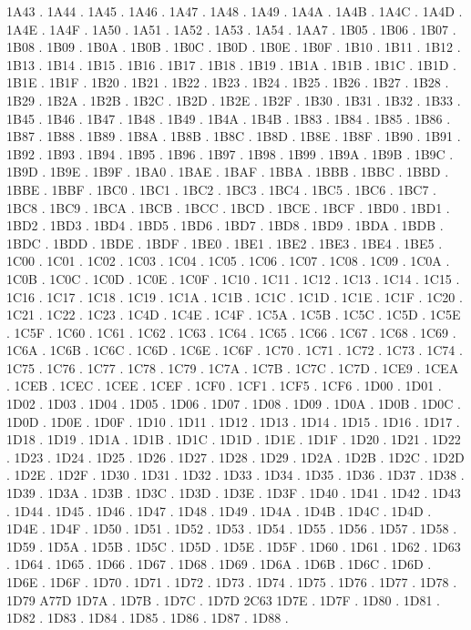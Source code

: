 1A43 .
1A44 .
1A45 .
1A46 .
1A47 .
1A48 .
1A49 .
1A4A .
1A4B .
1A4C .
1A4D .
1A4E .
1A4F .
1A50 .
1A51 .
1A52 .
1A53 .
1A54 .
1AA7 .
1B05 .
1B06 .
1B07 .
1B08 .
1B09 .
1B0A .
1B0B .
1B0C .
1B0D .
1B0E .
1B0F .
1B10 .
1B11 .
1B12 .
1B13 .
1B14 .
1B15 .
1B16 .
1B17 .
1B18 .
1B19 .
1B1A .
1B1B .
1B1C .
1B1D .
1B1E .
1B1F .
1B20 .
1B21 .
1B22 .
1B23 .
1B24 .
1B25 .
1B26 .
1B27 .
1B28 .
1B29 .
1B2A .
1B2B .
1B2C .
1B2D .
1B2E .
1B2F .
1B30 .
1B31 .
1B32 .
1B33 .
1B45 .
1B46 .
1B47 .
1B48 .
1B49 .
1B4A .
1B4B .
1B83 .
1B84 .
1B85 .
1B86 .
1B87 .
1B88 .
1B89 .
1B8A .
1B8B .
1B8C .
1B8D .
1B8E .
1B8F .
1B90 .
1B91 .
1B92 .
1B93 .
1B94 .
1B95 .
1B96 .
1B97 .
1B98 .
1B99 .
1B9A .
1B9B .
1B9C .
1B9D .
1B9E .
1B9F .
1BA0 .
1BAE .
1BAF .
1BBA .
1BBB .
1BBC .
1BBD .
1BBE .
1BBF .
1BC0 .
1BC1 .
1BC2 .
1BC3 .
1BC4 .
1BC5 .
1BC6 .
1BC7 .
1BC8 .
1BC9 .
1BCA .
1BCB .
1BCC .
1BCD .
1BCE .
1BCF .
1BD0 .
1BD1 .
1BD2 .
1BD3 .
1BD4 .
1BD5 .
1BD6 .
1BD7 .
1BD8 .
1BD9 .
1BDA .
1BDB .
1BDC .
1BDD .
1BDE .
1BDF .
1BE0 .
1BE1 .
1BE2 .
1BE3 .
1BE4 .
1BE5 .
1C00 .
1C01 .
1C02 .
1C03 .
1C04 .
1C05 .
1C06 .
1C07 .
1C08 .
1C09 .
1C0A .
1C0B .
1C0C .
1C0D .
1C0E .
1C0F .
1C10 .
1C11 .
1C12 .
1C13 .
1C14 .
1C15 .
1C16 .
1C17 .
1C18 .
1C19 .
1C1A .
1C1B .
1C1C .
1C1D .
1C1E .
1C1F .
1C20 .
1C21 .
1C22 .
1C23 .
1C4D .
1C4E .
1C4F .
1C5A .
1C5B .
1C5C .
1C5D .
1C5E .
1C5F .
1C60 .
1C61 .
1C62 .
1C63 .
1C64 .
1C65 .
1C66 .
1C67 .
1C68 .
1C69 .
1C6A .
1C6B .
1C6C .
1C6D .
1C6E .
1C6F .
1C70 .
1C71 .
1C72 .
1C73 .
1C74 .
1C75 .
1C76 .
1C77 .
1C78 .
1C79 .
1C7A .
1C7B .
1C7C .
1C7D .
1CE9 .
1CEA .
1CEB .
1CEC .
1CEE .
1CEF .
1CF0 .
1CF1 .
1CF5 .
1CF6 .
1D00 .
1D01 .
1D02 .
1D03 .
1D04 .
1D05 .
1D06 .
1D07 .
1D08 .
1D09 .
1D0A .
1D0B .
1D0C .
1D0D .
1D0E .
1D0F .
1D10 .
1D11 .
1D12 .
1D13 .
1D14 .
1D15 .
1D16 .
1D17 .
1D18 .
1D19 .
1D1A .
1D1B .
1D1C .
1D1D .
1D1E .
1D1F .
1D20 .
1D21 .
1D22 .
1D23 .
1D24 .
1D25 .
1D26 .
1D27 .
1D28 .
1D29 .
1D2A .
1D2B .
1D2C .
1D2D .
1D2E .
1D2F .
1D30 .
1D31 .
1D32 .
1D33 .
1D34 .
1D35 .
1D36 .
1D37 .
1D38 .
1D39 .
1D3A .
1D3B .
1D3C .
1D3D .
1D3E .
1D3F .
1D40 .
1D41 .
1D42 .
1D43 .
1D44 .
1D45 .
1D46 .
1D47 .
1D48 .
1D49 .
1D4A .
1D4B .
1D4C .
1D4D .
1D4E .
1D4F .
1D50 .
1D51 .
1D52 .
1D53 .
1D54 .
1D55 .
1D56 .
1D57 .
1D58 .
1D59 .
1D5A .
1D5B .
1D5C .
1D5D .
1D5E .
1D5F .
1D60 .
1D61 .
1D62 .
1D63 .
1D64 .
1D65 .
1D66 .
1D67 .
1D68 .
1D69 .
1D6A .
1D6B .
1D6C .
1D6D .
1D6E .
1D6F .
1D70 .
1D71 .
1D72 .
1D73 .
1D74 .
1D75 .
1D76 .
1D77 .
1D78 .
1D79 A77D
1D7A .
1D7B .
1D7C .
1D7D 2C63
1D7E .
1D7F .
1D80 .
1D81 .
1D82 .
1D83 .
1D84 .
1D85 .
1D86 .
1D87 .
1D88 .
